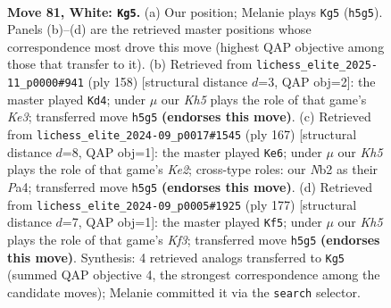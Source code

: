 \documentclass[11pt]{article}
\begin{document}
\clearpage

\begin{figure}[p]\centering
\begin{subfigure}{0.46\textwidth}\centering
\resizebox{\linewidth}{!}{%
\newchessgame
\chessboard[
  setfen={8/8/k7/7K/3r4/1R6/1N4P1/8 w - - 26 81},
  showmover=false,
  pgfstyle=straightmove, color=movearrow, markmove={h5-g5}
]}
\caption{}
\end{subfigure}\hfill
\begin{subfigure}{0.46\textwidth}\centering
\resizebox{\linewidth}{!}{%
\newchessgame
\chessboard[
  setfen={8/8/8/5k2/8/R1N1K3/1r6/8 w - - 1 80},
  showmover=false,
  pgfstyle=straightmove, color=movearrow, markmove={e3-d4}
]}
\caption{}
\end{subfigure}
\\[4pt]
\begin{subfigure}{0.46\textwidth}\centering
\resizebox{\linewidth}{!}{%
\newchessgame
\chessboard[
  setfen={8/4k3/8/8/p1r5/3R4/8/1K6 b - - 3 84},
  showmover=false,
  pgfstyle=straightmove, color=movearrow, markmove={e7-e6}
]}
\caption{}
\end{subfigure}\hfill
\begin{subfigure}{0.46\textwidth}\centering
\resizebox{\linewidth}{!}{%
\newchessgame
\chessboard[
  setfen={6R1/8/5k2/4n3/8/8/r7/3K4 b - - 65 89},
  showmover=false,
  pgfstyle=straightmove, color=movearrow, markmove={f6-f5}
]}
\caption{}
\end{subfigure}
\caption{\textbf{Move 81, White: \texttt{Kg5}.} (a) Our position; Melanie plays \texttt{Kg5} (\texttt{h5g5}). Panels (b)--(d) are the retrieved master positions whose correspondence most drove this move (highest QAP objective among those that transfer to it). (b) Retrieved from \texttt{lichess\_elite\_2025-11\_p0000\#941} (ply 158) [structural distance $d$=3, QAP obj=2]: the master played \texttt{Kd4}; under $\mu$ our \emph{Kh5} plays the role of that game's \emph{Ke3}; transferred move \texttt{h5g5} \textbf{(endorses this move)}. (c) Retrieved from \texttt{lichess\_elite\_2024-09\_p0017\#1545} (ply 167) [structural distance $d$=8, QAP obj=1]: the master played \texttt{Ke6}; under $\mu$ our \emph{Kh5} plays the role of that game's \emph{Ke2}; cross-type roles: our \emph{N}b2 as their \emph{P}a4; transferred move \texttt{h5g5} \textbf{(endorses this move)}. (d) Retrieved from \texttt{lichess\_elite\_2024-09\_p0005\#1925} (ply 177) [structural distance $d$=7, QAP obj=1]: the master played \texttt{Kf5}; under $\mu$ our \emph{Kh5} plays the role of that game's \emph{Kf3}; transferred move \texttt{h5g5} \textbf{(endorses this move)}. Synthesis: 4 retrieved analogs transferred to \texttt{Kg5} (summed QAP objective 4, the strongest correspondence among the candidate moves); Melanie committed it via the \texttt{search} selector.}
\label{fig:thought-m160}
\end{figure}
\end{document}
